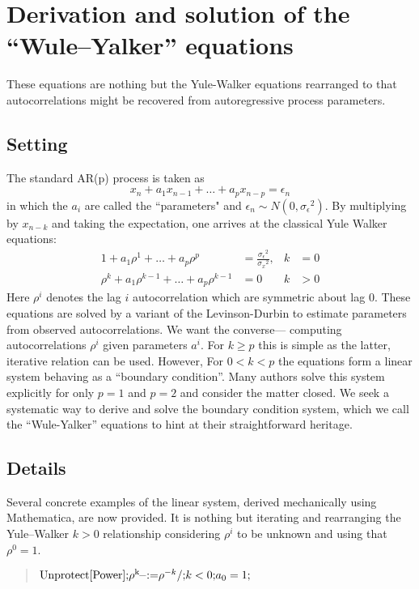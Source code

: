 \documentclass[12pt,letterpaper]{article}
\begin{document}
\section*{Derivation and solution of the ``Wule--Yalker'' equations}

These equations are nothing but the Yule-Walker equations rearranged to that
autocorrelations might be recovered from autoregressive process parameters.

\subsection*{Setting}

The standard AR(p) process is taken as
\[
x_n+a_1x_{n-1}+\dots+a_px_{n-p}=\epsilon _n
\]
in which the \(a_i\) are called the ``parameters" and \(\epsilon _n\sim
N\left(0,\sigma _{\epsilon }{}^2\right)\). By multiplying by \(x_{n-k}\) and
taking the expectation, one arrives at the classical Yule Walker equations:
\begin{align*}
1+a_1\rho ^1+\dots+a_p\rho ^p &= \frac{\sigma _{\epsilon }{}^2}{\sigma _x{}^2},
&
k&=0
\\
\rho ^k+a_1\rho ^{k-1}+\dots+a_p\rho ^{k-1}&=0
&
k &> 0
\end{align*}
Here $\rho^i$ denotes the lag $i$ autocorrelation which are symmetric about lag
$0$. These equations are solved by a variant of the Levinson-Durbin to estimate
parameters from observed autocorrelations. We want the converse--- computing
autocorrelations $\rho^i$ given parameters $a^i$.  For $k\geq p$ this is simple
as the latter, iterative relation can be used. However, For $0<k<p$ the
equations form a linear system behaving as a ``boundary condition''.  Many
authors solve this system explicitly for only $p=1$ and $p=2$ and consider the
matter closed.  We seek a systematic way to derive and solve the boundary
condition system, which we call the ``Wule-Yalker'' equations to hint at their
straightforward heritage.

\subsection*{Details}

Several concrete examples of the linear system, derived mechanically using
Mathematica, are now provided. It is nothing but iterating and rearranging the
Yule--Walker $k>0$ relationship considering $\rho ^i$ to be unknown and using
that $\rho^0=1$.

\begin{quote}
\noindent\({\text{Unprotect}[\text{Power}];}\\
{\rho ^{\text{k$\_$}}\text{:=}\rho ^{-k}\text{/;}k<0;}\\
{a_0=1;}\)
\end{quote}
\end{document}
